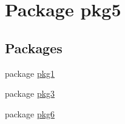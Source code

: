 \hypertarget{namespacepkg5}{}\section{Package pkg5}
\label{namespacepkg5}
\subsection*{Packages}
\begin{DoxyCompactItemize}
\item 
package \mbox{\hyperlink{namespacepkg5_1_1pkg1}{pkg1}}
\item 
package \mbox{\hyperlink{namespacepkg5_1_1pkg3}{pkg3}}
\item 
package \mbox{\hyperlink{namespacepkg5_1_1pkg6}{pkg6}}
\end{DoxyCompactItemize}

